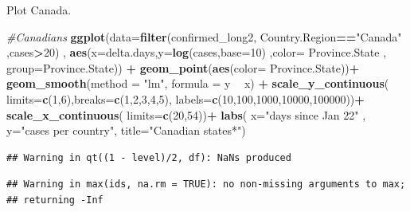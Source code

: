 \documentclass[]{article}
\newenvironment{Shaded}{\begin{snugshade}}{\end{snugshade}}
\newcommand{\CommentTok}[1]{\textcolor[rgb]{0.56,0.35,0.01}{\textit{#1}}}
\newcommand{\DataTypeTok}[1]{\textcolor[rgb]{0.13,0.29,0.53}{#1}}
\newcommand{\DecValTok}[1]{\textcolor[rgb]{0.00,0.00,0.81}{#1}}
\newcommand{\KeywordTok}[1]{\textcolor[rgb]{0.13,0.29,0.53}{\textbf{#1}}}
\newcommand{\NormalTok}[1]{#1}
\newcommand{\OperatorTok}[1]{\textcolor[rgb]{0.81,0.36,0.00}{\textbf{#1}}}
\newcommand{\StringTok}[1]{\textcolor[rgb]{0.31,0.60,0.02}{#1}}
\begin{document}
Plot Canada.

\begin{Shaded}
\begin{Highlighting}[]
\CommentTok{#Canadians}
\KeywordTok{ggplot}\NormalTok{(}\DataTypeTok{data=}\KeywordTok{filter}\NormalTok{(confirmed_long2, Country.Region}\OperatorTok{==}\StringTok{"Canada"}\NormalTok{   ,cases}\OperatorTok{>}\DecValTok{20}\NormalTok{) , }\KeywordTok{aes}\NormalTok{(}\DataTypeTok{x=}\NormalTok{delta.days,}\DataTypeTok{y=}\KeywordTok{log}\NormalTok{(cases,}\DataTypeTok{base=}\DecValTok{10}\NormalTok{) ,}\DataTypeTok{color=}\NormalTok{ Province.State , }\DataTypeTok{group=}\NormalTok{Province.State)) }\OperatorTok{+}
\StringTok{  }\KeywordTok{geom_point}\NormalTok{(}\KeywordTok{aes}\NormalTok{(}\DataTypeTok{color=}\NormalTok{ Province.State))}\OperatorTok{+}
\StringTok{    }\KeywordTok{geom_smooth}\NormalTok{(}\DataTypeTok{method =} \StringTok{"lm"}\NormalTok{, }\DataTypeTok{formula =}\NormalTok{ y }\OperatorTok{~}\StringTok{ }\NormalTok{x) }\OperatorTok{+}\StringTok{ }
\StringTok{  }\KeywordTok{scale_y_continuous}\NormalTok{( }\DataTypeTok{limits=}\KeywordTok{c}\NormalTok{(}\DecValTok{1}\NormalTok{,}\DecValTok{6}\NormalTok{),}\DataTypeTok{breaks=}\KeywordTok{c}\NormalTok{(}\DecValTok{1}\NormalTok{,}\DecValTok{2}\NormalTok{,}\DecValTok{3}\NormalTok{,}\DecValTok{4}\NormalTok{,}\DecValTok{5}\NormalTok{), }\DataTypeTok{labels=}\KeywordTok{c}\NormalTok{(}\DecValTok{10}\NormalTok{,}\DecValTok{100}\NormalTok{,}\DecValTok{1000}\NormalTok{,}\DecValTok{10000}\NormalTok{,}\DecValTok{100000}\NormalTok{))}\OperatorTok{+}
\StringTok{  }\KeywordTok{scale_x_continuous}\NormalTok{( }\DataTypeTok{limits=}\KeywordTok{c}\NormalTok{(}\DecValTok{20}\NormalTok{,}\DecValTok{54}\NormalTok{))}\OperatorTok{+}
\StringTok{  }\KeywordTok{labs}\NormalTok{( }\DataTypeTok{x=}\StringTok{"days since Jan 22"}\NormalTok{ , }\DataTypeTok{y=}\StringTok{"cases per country"}\NormalTok{, }\DataTypeTok{title=}\StringTok{"Canadian states*"}\NormalTok{)}
\end{Highlighting}
\end{Shaded}

\begin{verbatim}
## Warning in qt((1 - level)/2, df): NaNs produced
\end{verbatim}

\begin{verbatim}
## Warning in max(ids, na.rm = TRUE): no non-missing arguments to max;
## returning -Inf
\end{verbatim}
\end{document}
